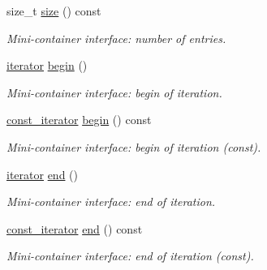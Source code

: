 \begin{DoxyCompactItemize}
size\_\-t \hyperlink{class_d_d4hep_1_1_conditions_1_1_conditions_dependency_collection_a49356f3bb237a65906d882d34b9ce295}{size} () const 
\begin{DoxyCompactList}\small\item\em Mini-\/container interface: number of entries. \item\end{DoxyCompactList}\item 
\hyperlink{class_d_d4hep_1_1_conditions_1_1_conditions_dependency_collection_a685a1a6841f2fa4d70ab9a9bfb7b0b6a}{iterator} \hyperlink{class_d_d4hep_1_1_conditions_1_1_conditions_dependency_collection_a975ac1f54aa844d4ae3c3e15f70bfdaa}{begin} ()
\begin{DoxyCompactList}\small\item\em Mini-\/container interface: begin of iteration. \item\end{DoxyCompactList}\item 
\hyperlink{class_d_d4hep_1_1_conditions_1_1_conditions_dependency_collection_ab5e9bcdc3330c3b694303f627799dc84}{const\_\-iterator} \hyperlink{class_d_d4hep_1_1_conditions_1_1_conditions_dependency_collection_a3ba4904a588f3c7145ef4be4d91a39ba}{begin} () const 
\begin{DoxyCompactList}\small\item\em Mini-\/container interface: begin of iteration (const). \item\end{DoxyCompactList}\item 
\hyperlink{class_d_d4hep_1_1_conditions_1_1_conditions_dependency_collection_a685a1a6841f2fa4d70ab9a9bfb7b0b6a}{iterator} \hyperlink{class_d_d4hep_1_1_conditions_1_1_conditions_dependency_collection_a6c3a1c17490c6e6f1eece6b9fe3b0db9}{end} ()
\begin{DoxyCompactList}\small\item\em Mini-\/container interface: end of iteration. \item\end{DoxyCompactList}\item 
\hyperlink{class_d_d4hep_1_1_conditions_1_1_conditions_dependency_collection_ab5e9bcdc3330c3b694303f627799dc84}{const\_\-iterator} \hyperlink{class_d_d4hep_1_1_conditions_1_1_conditions_dependency_collection_ac383d621dfe19531ec18d9e6139577e9}{end} () const 
\begin{DoxyCompactList}\small\item\em Mini-\/container interface: end of iteration (const). \item\end{DoxyCompactList}\item 

\end{DoxyCompactItemize}
